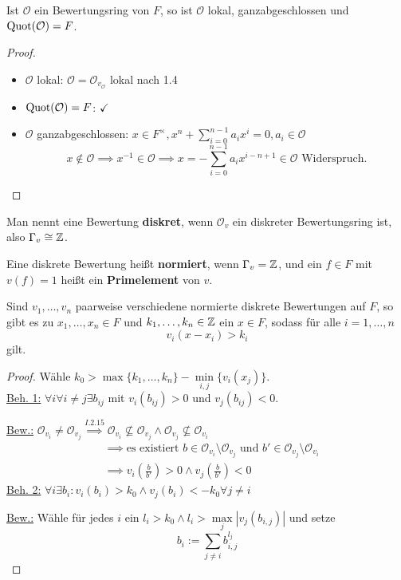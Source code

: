 \begin{korollar}
    Ist $\mathcal{O}$ ein Bewertungsring von $F$, so ist $\mathcal{O}$ lokal, ganzabgeschlossen und $\operatorname{Quot}(\mathcal{O}) = F$.
\end{korollar}
\begin{proof}
    \begin{itemize}
        \item $\mathcal{O}$ lokal: $\mathcal{O} = \mathcal{O}_{v_\mathcal{O}}$ lokal nach 1.4
        \item $\operatorname{Quot}(\mathcal{O}) = F$: $\checkmark$
        \item $\mathcal{O}$ ganzabgeschlossen: $x \in F^\times, x^n + \sum\limits_{i=0}^{n-1}a_i x^i = 0, a_i \in \mathcal{O}$
        $$x \notin \mathcal{O} \implies x^{-1} \in \mathcal{O} \implies x = - \sum\limits_{i=0}^{n-1}a_i x^{i - n +1} \in \mathcal{O} 
        \text{ Widerspruch.}$$
    \end{itemize}
\end{proof}

\begin{bemerkungnr}
    Man nennt eine Bewertung \textbf{diskret}, wenn $\mathcal{O}_v$ ein diskreter Bewertungsring ist, also 
    $\Gamma_v \cong \mathbb{Z}$.

    Eine diskrete Bewertung heißt \textbf{normiert}, wenn $\Gamma_v = \mathbb{Z}$, und ein $f \in F$ mit $v(f) = 1$ heißt
    ein \textbf{Primelement} von $v$.
\end{bemerkungnr}

\begin{theorem}
    Sind $v_1,\ldots,v_n$ paarweise verschiedene normierte diskrete Bewertungen auf $F$, so gibt es zu 
    $x_1,\ldots,x_n \in F$ und $k_1, \ldots,k_n \in \mathbb{Z}$ ein $x \in F$, sodass für alle $i = 1, \ldots,n$
    $$ v_i(x - x_i) > k_i$$
    gilt.  
\end{theorem}
\begin{proof}
    Wähle $k_0 > \max\{k_1, \ldots, k_n\} - \min\limits_{i,j}\{v_i(x_j)\}$.\\
    \underline{Beh. 1:} $\forall i \forall i\ne j \exists b_{ij}$ mit $v_i(b_{ij}) > 0$ und $v_j(b_{ij}) < 0$.

    \underline{Bew.:} $\mathcal{O}_{v_i} \ne \mathcal{O}_{v_j} \stackrel{I.2.15}{\implies} \mathcal{O}_{v_i} \not \subseteq \mathcal{O}_{v_j}
    \land \mathcal{O}_{v_j} \not \subseteq \mathcal{O}_{v_i}$ 
    \begin{align*}
        & \implies \text{es existiert } b \in \mathcal{O}_{v_i} \setminus \mathcal{O}_{v_j} \text{ und } b' \in \mathcal{O}_{v_j} \setminus \mathcal{O}_{v_i}\\
        & \implies v_i(\frac{b}{b'}) > 0 \land v_j(\frac{b}{b'}) < 0
    \end{align*}
    \underline{Beh. 2:} $\forall i \exists b_i: v_i(b_i) > k_0 \land v_j(b_i) < -k_0 \forall j \ne i$

    \underline{Bew.:} Wähle für jedes $i$ ein $l_i > k_0 \land l_i > \max\limits_{j}|v_{j}(b_{i,j})|$ und setze
    $$ b_i := \sum\limits_{j \ne i} b_{i,j}^{l_j}$$

\end{proof}


